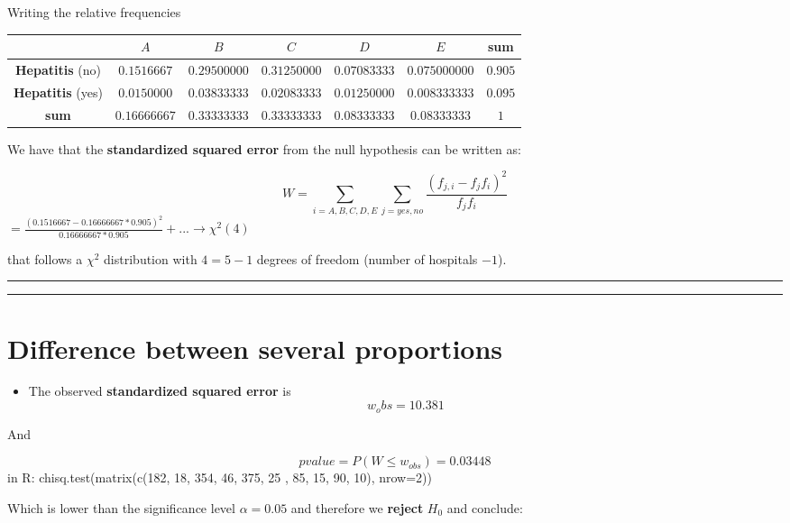 \documentclass[
]{book}
\providecommand{\tightlist}{%
  \setlength{\itemsep}{0pt}\setlength{\parskip}{0pt}}
\begin{document}
Writing the relative frequencies

\begin{longtable}[]{@{}ccccccc@{}}
\toprule
& \(A\) & \(B\) & \(C\) & \(D\) & \(E\) & sum \\
\midrule
\endhead
\textbf{Hepatitis} (no) & \(0.1516667\) & \(0.29500000\) & \(0.31250000\) & \(0.07083333\) & \(0.075000000\) & \(0.905\) \\
\textbf{Hepatitis} (yes) & \(0.0150000\) & \(0.03833333\) & \(0.02083333\) & \(0.01250000\) & \(0.008333333\) & \(0.095\) \\
\textbf{sum} & \(0.16666667\) & \(0.33333333\) & \(0.33333333\) & \(0.08333333\) & \(0.08333333\) & \(1\) \\
\bottomrule
\end{longtable}

We have that the \textbf{standardized squared error} from the null hypothesis can be written as:

\[W= \sum_{i=A,B,C,D,E} \sum_{j=yes,no} \frac{(f_{j,i}-f_{j}f_{i})^2}{f_{j}f_{i}}\]
\(= \frac{(0.1516667 - 0.16666667*0.905)^2}{0.16666667*0.905} + ... \rightarrow \chi^2(4)\)

that follows a \(\chi^2\) distribution with \(4=5-1\) degrees of freedom (number of hospitals \(-1\)).

\begin{center}\rule{0.5\linewidth}{0.5pt}\end{center}

\begin{center}\rule{0.5\linewidth}{0.5pt}\end{center}

\hypertarget{difference-between-several-proportions-2}{%
\section{Difference between several proportions}\label{difference-between-several-proportions-2}}

\begin{itemize}
\tightlist
\item
  The observed \textbf{standardized squared error} is
  \[w_obs=10.381\]
\end{itemize}

And

\[pvalue=P(W \leq w_{obs}) = 0.03448\]
in R:
chisq.test(matrix(c(182, 18, 354, 46, 375, 25 , 85, 15, 90, 10), nrow=2))

Which is lower than the significance level \(\alpha=0.05\) and therefore we \textbf{reject} \(H_0\) and conclude:
\end{document}
